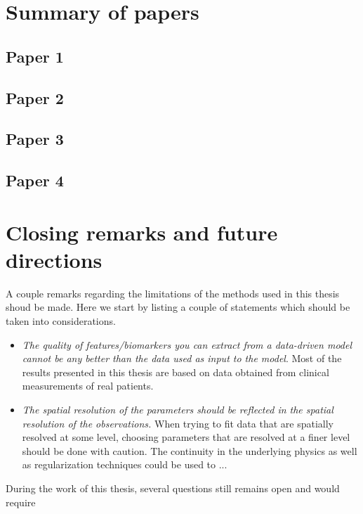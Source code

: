 
\section{Summary of papers}


\subsection{Paper 1}

\subsection{Paper 2}

\subsection{Paper 3}

\subsection{Paper 4}

\section{Closing remarks and future directions}

A couple remarks regarding the limitations of the methods used in this
thesis shoud be made. Here we start by listing a couple of statements
which should be taken into considerations. 


\begin{itemize}
\item \emph{The quality of features/biomarkers you can extract from a data-driven
model cannot be any better than the data used as input to the
model}. Most of the results presented in this thesis are based on data
obtained from clinical measurements of real patients.
\item \emph{The spatial resolution of the parameters should be
    reflected in the spatial resolution of the observations.} When
  trying to fit data that are spatially resolved at some level,
  choosing parameters that are resolved at a finer level should be
  done with caution. The continuity in the underlying physics as well
  as regularization techniques could be used to ...

\end{itemize}

During the work of this thesis, several questions still remains open
and would require

